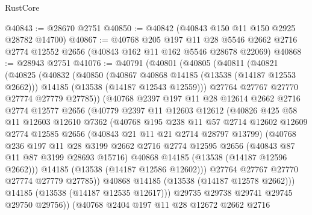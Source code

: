 \begin{lexlean}{RustCore}
\begin{coremodule}
@40843 := @28670 @2751
@40850 := @40842 (@40843 @150 @11 @150 @2925 @28782 @14700)
@40867 := @40768
    @205
    @197
    @11
    @28
    @5546
    @2662
    @2716
    @2774
    @12552
    @2656
    (@40843 @162 @11 @162 @5546 @28678 @22069)
@40868 := @28943 @2751
@41076 := @40791
    (@40801
      (@40805
        (@40811
          (@40821
            (@40825
              (@40832
                (@40850
                  (@40867 @40868 @14185 (@13538 (@14187 @12553 @2662)))
                  @14185
                  (@13538 (@14187 @12543 @12559)))
                @27764
                @27767
                @27770
                @27774
                @27779
                @27785))
            (@40768
              @2397
              @197
              @11
              @28
              @12614
              @2662
              @2716
              @2774
              @12577
              @2656
              (@40779
                @2397
                @11
                @12603
                @12612
                (@40826
                  @425
                  @58
                  @11
                  @12603
                  @12610
                  @7362
                  (@40768
                    @195
                    @238
                    @11
                    @57
                    @2714
                    @12602
                    @12609
                    @2774
                    @12585
                    @2656
                    (@40843 @21 @11 @21 @2714 @28797 @13799)
                    (@40768
                      @236
                      @197
                      @11
                      @28
                      @3199
                      @2662
                      @2716
                      @2774
                      @12595
                      @2656
                      (@40843 @87 @11 @87 @3199 @28693 @15716)
                      @40868
                      @14185
                      (@13538 (@14187 @12596 @2662)))
                    @14185
                    (@13538 (@14187 @12586 @12602)))
                  @27764
                  @27767
                  @27770
                  @27774
                  @27779
                  @27785))
              @40868
              @14185
              (@13538 (@14187 @12578 @2662)))
            @14185
            (@13538 (@14187 @12535 @12617)))
          @29735
          @29738
          @29741
          @29745
          @29750
          @29756))
      (@40768
        @2404
        @197
        @11
        @28
        @12672
        @2662
        @2716

\end{coremodule}
\end{lexlean}
